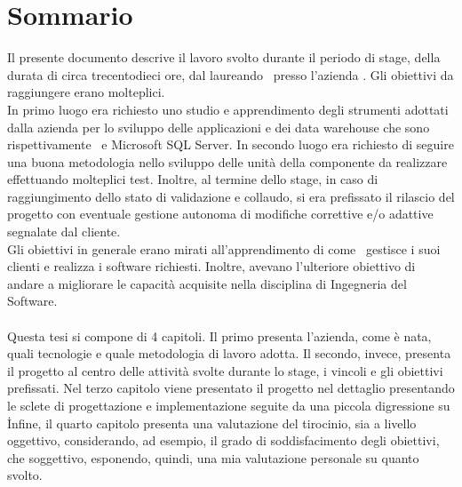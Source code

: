 
\cleardoublepage
{}
{}
\begingroup
\let\clearpage\relax
\let\cleardoublepage\relax
\let\cleardoublepage\relax

\chapter*{Sommario}

Il presente documento descrive il lavoro svolto durante il periodo di stage, della durata di circa trecentodieci ore, dal laureando \myName\ presso l'azienda \azienda .
Gli obiettivi da raggiungere erano molteplici.\\
In primo luogo era richiesto uno studio e apprendimento degli strumenti adottati dalla azienda per lo sviluppo delle applicazioni e dei data warehouse che sono rispettivamente \inde\ e  Microsoft SQL Server. In secondo luogo era richiesto di seguire una buona metodologia nello sviluppo delle unità della componente da realizzare effettuando molteplici test. Inoltre, al termine dello stage, in caso di raggiungimento dello stato di validazione e collaudo, si era prefissato il rilascio del progetto con eventuale gestione autonoma di modifiche correttive e/o adattive segnalate dal cliente.\\
Gli obiettivi in generale erano mirati all'apprendimento di come \azienda\ gestisce i suoi clienti e realizza i software richiesti. Inoltre, avevano l'ulteriore obiettivo di andare a migliorare le capacità acquisite nella disciplina di Ingegneria del Software.\\
\\
Questa tesi si compone di 4 capitoli. 
Il primo presenta l'azienda, come è nata, quali tecnologie e quale metodologia di lavoro adotta. Il secondo, invece, presenta il progetto al centro delle attività svolte durante lo stage, i vincoli e gli obiettivi prefissati. Nel terzo capitolo viene presentato il progetto nel dettaglio presentando le sclete di progettazione e implementazione seguite da una piccola digressione su \inde\.
Infine, il quarto capitolo presenta una valutazione del tirocinio, sia a livello oggettivo, considerando, ad esempio, il grado di soddisfacimento degli obiettivi, che soggettivo, esponendo, quindi, una mia valutazione personale su quanto svolto.


%
%

\endgroup			

\vfill

